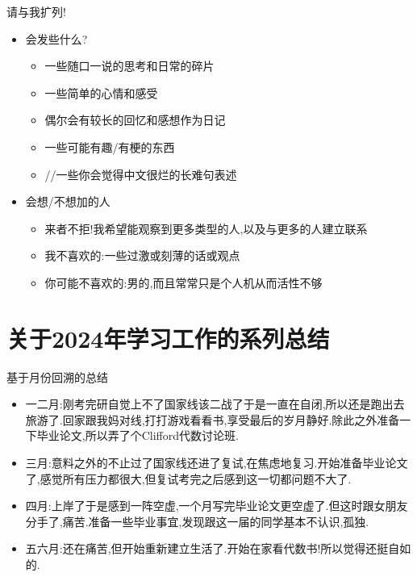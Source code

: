 \documentclass{beamer}
\begin{document}
\begin{frame}{请与我扩列!}
    \begin{itemize}
        \item 会发些什么?
        \begin{itemize}
            \item 一些随口一说的思考和日常的碎片
            \item 一些简单的心情和感受
            \item 偶尔会有较长的回忆和感想作为日记
            \item 一些可能有趣/有梗的东西
            \item //一些你会觉得中文很烂的长难句表述
        \end{itemize}
        \item 会想/不想加的人
        \begin{itemize}
            \item 来者不拒!我希望能观察到更多类型的人,以及与更多的人建立联系
            \item 我不喜欢的:一些过激或刻薄的话或观点
            \item 你可能不喜欢的:男的,而且常常只是个人机从而活性不够
        \end{itemize}
    \end{itemize}
\end{frame}

\section{关于2024年学习工作的系列总结}
\begin{frame}{基于月份回溯的总结}
\begin{itemize}
    \item 一二月:刚考完研自觉上不了国家线该二战了于是一直在自闭,所以还是跑出去旅游了.回家跟我妈对线,打打游戏看看书,享受最后的岁月静好.除此之外准备一下毕业论文,所以弄了个Clifford代数讨论班.
    \item 三月:意料之外的不止过了国家线还进了复试,在焦虑地复习.开始准备毕业论文了,感觉所有压力都很大,但复试考完之后感到这一切都问题不大了.
    \item 四月:上岸了于是感到一阵空虚,一个月写完毕业论文更空虚了.但这时跟女朋友分手了,痛苦.准备一些毕业事宜,发现跟这一届的同学基本不认识,孤独.
    \item 五六月:还在痛苦,但开始重新建立生活了.开始在家看代数书!所以觉得还挺自如的.
\end{itemize}
\end{frame}
\end{document}
